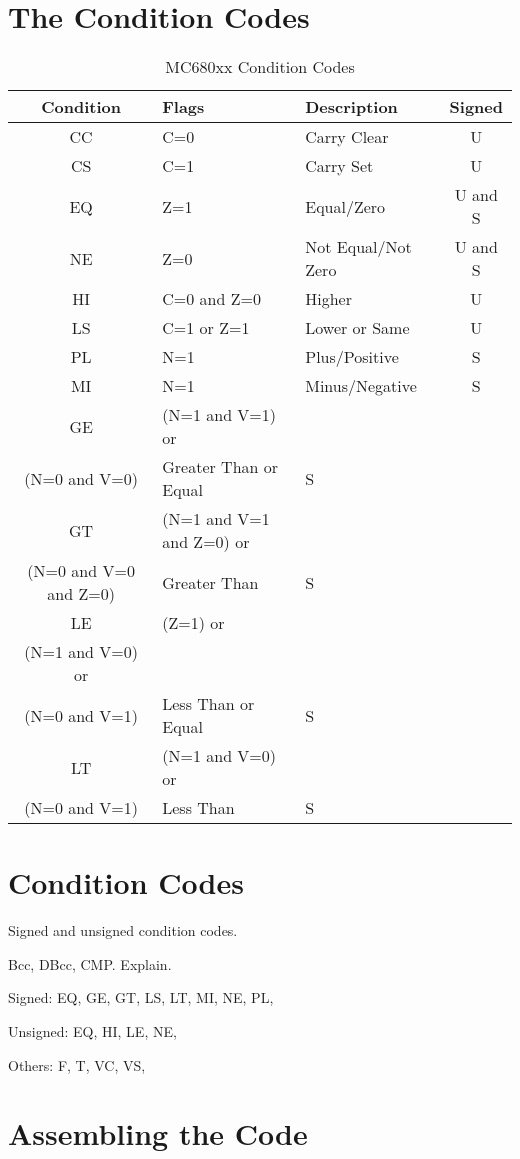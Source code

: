 \section{The Condition Codes}

\begin{table}[!h]
\begin{centering}
\begin{tabular}{|c|>{\centering}p{}|>{\centering}p{}|c|}
\hline 
\textbf{Condition} & \textbf{Flags} & \textbf{Description} & \textbf{Signed}\tabularnewline
\hline 
\hline 
CC & C=0 & Carry Clear & U\tabularnewline
\hline 
CS & C=1 & Carry Set & U\tabularnewline
\hline 
EQ & Z=1 & Equal/Zero & U and S\tabularnewline
\hline 
NE & Z=0 & Not Equal/Not Zero & U and S\tabularnewline
\hline 
HI & C=0 and Z=0 & Higher & U\tabularnewline
\hline 
LS & C=1 or Z=1 & Lower or Same & U\tabularnewline
\hline 
PL & N=1 & Plus/Positive & S\tabularnewline
\hline 
MI & N=1 & Minus/Negative & S\tabularnewline
\hline 
GE & (N=1 and V=1) or\\
(N=0 and V=0) & Greater Than or Equal & S\tabularnewline
\hline 
GT & (N=1 and V=1 and Z=0) or \\
(N=0 and V=0 and Z=0) & Greater Than & S\tabularnewline
\hline 
LE & (Z=1) or \\
(N=1 and V=0) or \\
(N=0 and V=1) & Less Than or Equal & S\tabularnewline
\hline 
LT & (N=1 and V=0) or \\
(N=0 and V=1) & Less Than & S\tabularnewline
\hline 
\end{tabular}
\par\end{centering}
\caption{MC680xx Condition Codes\label{tab:MC680xx-Condition-Codes}}
\end{table}


\section{Condition Codes}

Signed and unsigned condition codes.

Bcc, DBcc, CMP. Explain.

Signed: EQ, GE, GT, LS, LT, MI, NE, PL, 

Unsigned: EQ, HI, LE, NE, 

Others: F, T, VC, VS,

\section{Assembling the Code}

